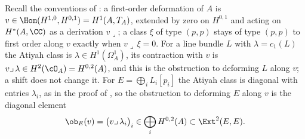 Recall the conventions of : a first-order deformation of
$A$ is $v\in\Hom(H^{1,0},H^{0,1})=H^{1}(A,T_{A})$, extended by zero on
$H^{0,1}$ and acting on $H^{*}(A,\CC)$ as a derivation $v\lrcorner$; a class
$\xi$ of type $(p,p)$ stays of type $(p,p)$ to first order along $v$ exactly
when $v\lrcorner\,\xi=0$. For a line bundle $L$ with $\lambda=c_{1}(L)$ the
Atiyah class is $\lambda\in H^{1}(\Omega^{1}_{A})$, its contraction with $v$
is $v\lrcorner\,\lambda\in H^{2}(\cO_{A})=H^{0,2}(A)$, and this is the
obstruction to deforming $L$ along $v$; a shift does not change it. For
$E=\bigoplus_{i}L_{i}[p_{i}]$ the Atiyah class is diagonal with entries
$\lambda_{i}$, as in the proof of , so the
obstruction to deforming $E$ along $v$ is the diagonal element
\begin{equation}\label{eq:obdef}
  \ob_{E}(v)=\bigl(v\lrcorner\,\lambda_{i}\bigr)_{i}
  \in\bigoplus_{i}H^{0,2}(A)\subset\Ext^{2}(E,E).
\end{equation}

